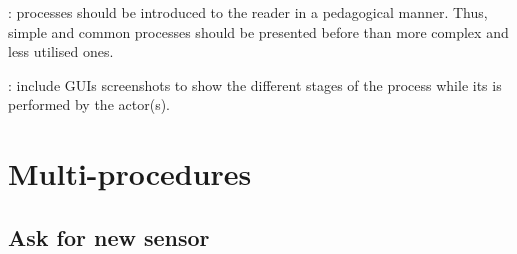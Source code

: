 : processes should be introduced to the
reader in a pedagogical manner. Thus, simple and common processes should be presented before
than more complex and less utilised ones.

: include GUIs screenshots to show the
different stages of the process while its is performed by the actor(s).






\section{Multi-procedures}

\subsection{Ask for new sensor}

